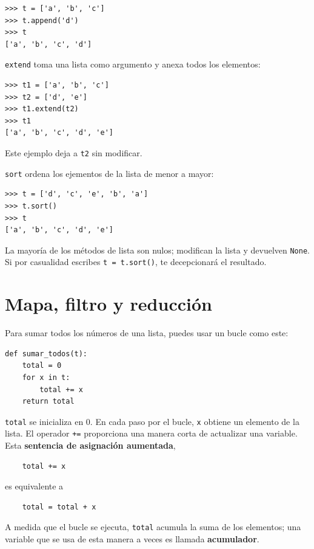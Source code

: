 \documentclass[10pt]{book}
\begin{document}
\begin{verbatim}
>>> t = ['a', 'b', 'c']
>>> t.append('d')
>>> t
['a', 'b', 'c', 'd']
\end{verbatim}
%
{\tt extend} toma una lista como argumento y anexa todos
los elementos:

\begin{verbatim}
>>> t1 = ['a', 'b', 'c']
>>> t2 = ['d', 'e']
>>> t1.extend(t2)
>>> t1
['a', 'b', 'c', 'd', 'e']
\end{verbatim}
%
Este ejemplo deja a {\tt t2} sin modificar.

{\tt sort} ordena los ejementos de la lista de menor a mayor:

\begin{verbatim}
>>> t = ['d', 'c', 'e', 'b', 'a']
>>> t.sort()
>>> t
['a', 'b', 'c', 'd', 'e']
\end{verbatim}
%
La mayoría de los métodos de lista son nulos; modifican la lista y devuelven {\tt None}.
Si por casualidad escribes {\tt t = t.sort()}, te decepcionará
el resultado.


\section{Mapa, filtro y reducción}
\label{filter}

Para sumar todos los números de una lista, puedes usar un bucle como este:


\begin{verbatim}
def sumar_todos(t):
    total = 0
    for x in t:
        total += x
    return total
\end{verbatim}
%
{\tt total} se inicializa en 0.  En cada paso por el bucle,
{\tt x} obtiene un elemento de la lista.  El operador {\tt +=}
proporciona una manera corta de actualizar una variable.  Esta
{\bf sentencia de asignación aumentada},

\begin{verbatim}
    total += x
\end{verbatim}
%
es equivalente a

\begin{verbatim}
    total = total + x
\end{verbatim}
%
A medida que el bucle se ejecuta, {\tt total} acumula la suma de los
elementos; una variable que se usa de esta manera a veces es llamada
{\bf acumulador}.
\end{document}
